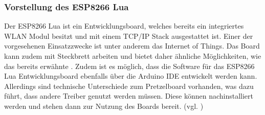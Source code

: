 \subsubsection{Vorstellung des ESP8266 Lua}        
\label{sec:Vorstellung des ESP8266} 

Der ESP8266 Lua ist ein Entwicklungsboard, welches bereits ein integriertes WLAN Modul besitzt und mit einem \ac{TCP}/\ac{IP} Stack ausgestattet ist. Einer der vorgesehenen Einsatzzwecke ist unter anderem das Internet of Things. Das Board kann zudem mit Steckbrett arbeiten und bietet daher ähnliche Möglichkeiten, wie das bereits erwähnte . Zudem ist es möglich, dass die Software für das ESP8266 Lua Entwicklungsboard ebenfalls über die Arduino \ac{IDE} entwickelt werden kann. Allerdings sind technische Unterschiede zum Pretzelboard vorhanden, was dazu führt, dass andere Treiber genutzt werden müssen. 
Diese können nachinstalliert werden und stehen dann zur Nutzung des Boards bereit. (vgl. \cite{Carius.15.01.2017}\cite{.d})

